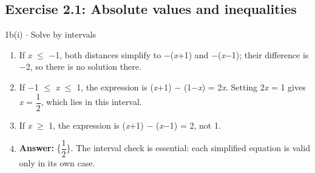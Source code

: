 \documentclass[11pt]{article}
\begin{document}
\begin{keepsection}\subsection{Exercise 2.1: Absolute values and inequalities}

\begin{workedbox}{1b(i) \ensuremath{\cdot} Solve by intervals}
\begin{enumerate}
\item If \textit{x} \ensuremath{\leq} \ensuremath{-}1, both distances simplify to \ensuremath{-}(\textit{x}+1) and \ensuremath{-}(\textit{x}\ensuremath{-}1); their difference is \ensuremath{-}2, so there is no solution there.
\item If \ensuremath{-}1 \ensuremath{\leq} \textit{x} \ensuremath{\leq} 1, the expression is (\textit{x}+1) \ensuremath{-} (1\ensuremath{-}\textit{x}) = 2\textit{x}. Setting 2\textit{x} = 1 gives \textit{x} = {\small\ensuremath{\dfrac{1}{2}}}, which lies in this interval.
\item If \textit{x} \ensuremath{\geq} 1, the expression is (\textit{x}+1) \ensuremath{-} (\textit{x}\ensuremath{-}1) = 2, not 1.
\item \textbf{Answer:} \{{\small\ensuremath{\dfrac{1}{2}}}\}. The interval check is essential: each simplified equation is valid only in its own case.
\end{enumerate}
\end{workedbox}

\end{keepsection}
\end{document}
